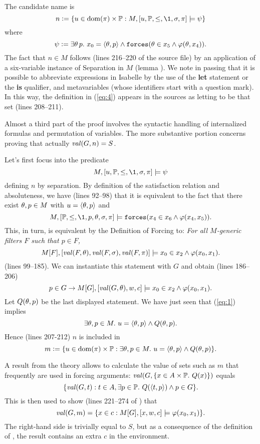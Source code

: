 The candidate name is
\begin{equation}\label{eq:4}
n \defi \{u \in\dom(\pi)\times\PP :M,[u,\PP,\leq,\1,\sig,\pi]\models \psi\}
\end{equation}
where
\[
\psi \mathrel{\mathop:}= \exists \theta\, p.\ x_0=\langle\theta,p\rangle \wedge 
   \mathop{\mathtt{forces}}(\theta\in x_5\wedge\varphi(\theta,x_4)).
\]
The fact that $n\in M$ follows (lines 216--220 of the source file) by
an application of a six-variable instance of Separation in $M$ (lemma
). We note in
passing that it is possible to  abbreviate expressions in Isabelle by
the use of the  \textbf{let} statement or the \textbf{is} qualifier,
and metavariables (whose
identifiers start with a question mark). In this way, the definition in
(\ref{eq:4}) appears in the sources as letting  to be that
set (lines 208--211).

Almost a third part of the proof involves the syntactic handling of
internalized formulas and permutation of variables. The more
substantive portion concerns proving that actually $\operatorname{\mathit{val}}(G,n)=S$.

Let's first focus into the predicate 
\begin{equation}\label{eq:1}
M,[u,\PP,\leq,\1,\sig,\pi]\models \psi
\end{equation}
defining $n$ by separation. By definition of the satisfaction
relation and %
absoluteness, we have (lines 92--98) that it is equivalent to the fact
that there exist $\theta,p\in M$ with   $u=\langle\theta,p\rangle$  and 
\[
M,[\PP,\leq,\1,p,\th,\sig,\pi]\models \forceisa(x_4\in
x_6\y\phi(x_4,x_5)). 
\]
This, in turn, is equivalent by the Definition of Forcing to: \emph{For all $M$-generic
filters $F$ such that $p\in F$,} 
\begin{equation}\label{eq:2}
M[F],[\val(F,\th),\val(F,\sig),\val(F,\pi)]\models x_0\in
x_2\y\phi(x_0,x_1). 
\end{equation}
(lines 99--185). We can instantiate this statement with $G$ and obtain
(lines 186--206)
\[
p\in G \rightarrow M[G],[\operatorname{\mathit{val}}(G,\theta),w,c]\models x_0\in
x_2\wedge\varphi(x_0,x_1). 
\] 
Let $Q(\theta,p)$ be the last displayed statement. We have just seen that
(\ref{eq:1}) implies 
\[
\exists \theta,p\in M.\ u=\langle\theta,p\rangle \wedge Q(\theta,p).
\]
Hence (lines 207-212) $n$ is included in 
\[
m\mathrel{\mathop:}= \{u \in\operatorname{dom}(\pi)\times\mathbb{P} : \exists \theta,p\in M.\ u=\langle\theta,p\rangle
\wedge Q(\theta,p)\}. 
\]

A result from the theory  allows to calculate the value
of sets such as $m$ that frequently are used in forcing arguments: 
$\operatorname{\mathit{val}}(G,\{x\in A\times \mathbb{P}.\ Q(x)\})$ equals
\[
\{\operatorname{\mathit{val}}(G,t) : t\in A , \exists
  p\in \mathbb{P} .\ Q(\langle t,p\rangle) \wedge p \in G\}.
\]
This is then used to show  (lines 221--274 of ) that 
\[
  \operatorname{\mathit{val}}(G,m) = \{x\in c : M[G],[x,w,c]\models \varphi(x_0,x_1)\}.
\]
The right-hand side is trivially equal to $S$, but as a consequence of
the definition of 
, the result contains an extra $c$ in the
environment.

